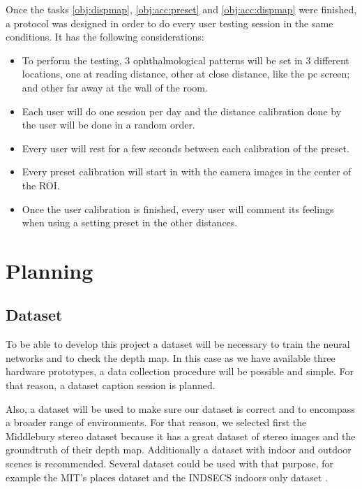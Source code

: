 \documentclass[10pt,a4paper,twocolumn,twoside]{article}
\begin{document}
	Once the tasks \ref{obj:dispmap}, \ref{obj:acc:preset} and \ref{obj:acc:dispmap} were finished, a protocol was designed in order to do every user testing session in the same conditions. It has the following considerations: 

	\begin{itemize}
		\item To perform the testing, 3 ophthalmological patterns will be set in 3 different locations, one at reading distance, other at close distance, like the pc screen; and other far away at the wall of the room. 
		\item  Each user will do one session per day and the distance calibration done by the user will be done in a random order. 
		\item  Every user will rest for a few seconds between each calibration of the preset.  
		\item  Every preset calibration will start in with the camera images in the center of the ROI. 
		\item  Once the user calibration is finished, every user will comment its feelings when using a setting preset in the other distances. 
	\end{itemize}
	
	
	\section{Planning}
	\label{sec:planning}
	
	\subsection{Dataset}
	\label{subsec:dataset}
	To be able to develop this project a dataset will be necessary to train the neural networks and to check the depth map. In this case as we have available three hardware prototypes, a data collection procedure will be possible and simple. For that reason, a dataset caption session is planned.
	
	Also, a dataset will be used to make sure our dataset is correct and to encompass a broader range of environments. For that reason, we selected first the Middlebury stereo dataset \cite{web:middelburyDataset} because it has a great dataset of stereo images and the groundtruth of their depth map. Additionally a dataset with indoor and outdoor scenes is recommended. Several dataset could be used with that purpose, for example the MIT's places dataset \cite{web:mitplaces} and the INDSECS indoors only dataset \cite{web:indecs}.
	
\end{document}
